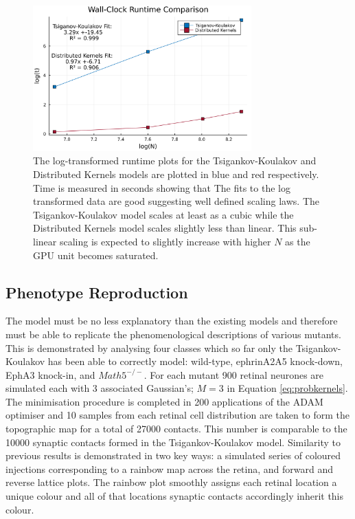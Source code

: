 \begin{figure}[h]
	\centering
	\includegraphics[width=0.75\textwidth]{images/distributed_kernels/figure_runtime}
	\def\c{The log-transformed runtime plots for the Tsigankov-Koulakov and Distributed Kernels models are plotted in blue and red respectively}
	\caption[\c]{\label{fig:distributedruntimes} \c. Time is measured in seconds showing that The fits to the log transformed data are good suggesting well defined scaling laws. The Tsigankov-Koulakov model scales at least as a cubic while the Distributed Kernels model scales slightly less than linear. This sub-linear scaling is expected to slightly increase with higher $N$ as the GPU unit becomes saturated.}
\end{figure}

\subsection{Phenotype Reproduction}
The model must be no less explanatory than the existing models and therefore must be able to replicate the phenomenological descriptions of various mutants. This is demonstrated by analysing four classes which so far only the Tsigankov-Koulakov has been able to correctly model: wild-type, ephrinA2A5 knock-down, EphA3 knock-in, and $Math5^{-/-}$. For each mutant 900 retinal neurones are simulated each with 3 associated Gaussian's; $M = 3$ in Equation \ref{eq:probkernels}. The minimisation procedure is completed in 200 applications of the ADAM optimiser and 10 samples from each retinal cell distribution are taken to form the topographic map for a total of 27000 contacts. This number is comparable to the 10000 synaptic contacts formed in the Tsigankov-Koulakov model. Similarity to previous results is demonstrated in two key ways: a simulated series of coloured injections corresponding to a rainbow map across the retina, and forward and reverse lattice plots. The rainbow plot smoothly assigns each retinal location a unique colour and all of that locations synaptic contacts accordingly inherit this colour.

